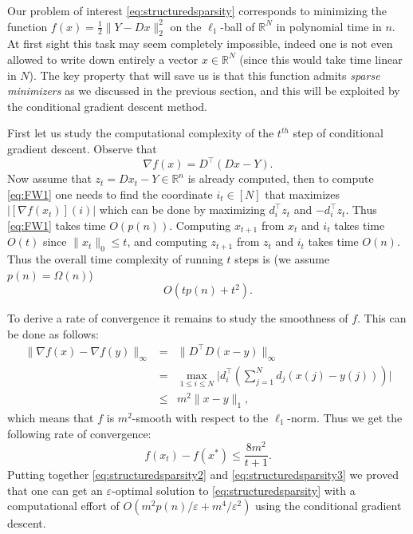 \documentclass[openany]{now}
\renewcommand{\epsilon}{\varepsilon}
\begin{document}
Our problem of interest \eqref{eq:structuredsparsity} corresponds to minimizing the function $f(x) = \frac{1}{2} \| Y - D x \|^2_2$ on the $\ell_1$-ball of $\mathbb{R}^N$ in polynomial time in $n$. At first sight this task may seem completely impossible, indeed one is not even allowed to write down entirely a vector $x \in \mathbb{R}^N$ (since this would take time linear in $N$). The key property that will save us is that this function admits {\em sparse minimizers} as we discussed in the previous section, and this will be exploited by the conditional gradient descent method. 

First let us study the computational complexity of the $t^{th}$ step of conditional gradient descent. Observe that
$$\nabla f(x) = D^{\top} (D x - Y).$$
Now assume that $z_t = D x_t - Y \in \mathbb{R}^n$ is already computed, then to compute \eqref{eq:FW1} one needs to find the coordinate $i_t \in [N]$ that maximizes $|[\nabla f(x_t)](i)|$ which can be done by maximizing $d_i^{\top} z_t$ and $- d_i^{\top} z_t$. Thus \eqref{eq:FW1} takes time $O(p(n))$. Computing $x_{t+1}$ from $x_t$ and $i_{t}$ takes time $O(t)$ since $\|x_t\|_0 \leq t$, and computing $z_{t+1}$ from $z_t$ and $i_t$ takes time $O(n)$. Thus the overall time complexity of running $t$ steps is (we assume $p(n) = \Omega(n)$) 
\begin{equation}
O(t p(n) + t^2). \label{eq:structuredsparsity2}
\end{equation} 

To derive a rate of convergence it remains to study the smoothness of $f$. This can be done as follows:
\begin{eqnarray*}
\| \nabla f(x) - \nabla f(y) \|_{\infty} & = & \|D^{\top} D (x-y) \|_{\infty} \\
& = & \max_{1 \leq i \leq N} \bigg| d_i^{\top} \left(\sum_{j=1}^N d_j (x(j) - y(j))\right) \bigg| \\
& \leq & m^2 \|x-y\|_1 ,
\end{eqnarray*}
which means that $f$ is $m^2$-smooth with respect to the $\ell_1$-norm. Thus we get the following rate of convergence:
\begin{equation}
f(x_t) - f(x^*) \leq \frac{8 m^2}{t+1} . \label{eq:structuredsparsity3}
\end{equation}
Putting together \eqref{eq:structuredsparsity2} and \eqref{eq:structuredsparsity3} we proved that one can get an $\epsilon$-optimal solution to \eqref{eq:structuredsparsity} with a computational effort of $O(m^2 p(n)/\epsilon + m^4/\epsilon^2)$ using the conditional gradient descent.
\end{document}

